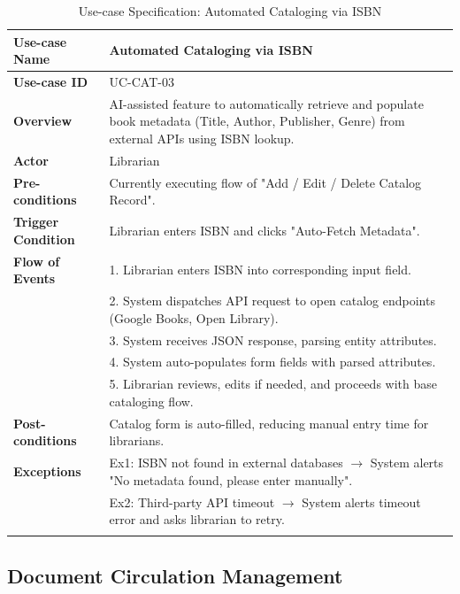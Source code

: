 \begin{longtable}{|p{3.5cm}|p{11.5cm}|}
    \hline
    \textbf{Use-case Name} & \textbf{Automated Cataloging via ISBN} \\
    \hline
    \textbf{Use-case ID} & UC-CAT-03 \\
    \hline
    \textbf{Overview} & AI-assisted feature to automatically retrieve and populate book metadata (Title, Author, Publisher, Genre) from external APIs using ISBN lookup. \\
    \hline
    \textbf{Actor} & Librarian \\
    \hline
    \textbf{Pre-conditions} & Currently executing flow of "Add / Edit / Delete Catalog Record". \\
    \hline
    \textbf{Trigger Condition} & Librarian enters ISBN and clicks "Auto-Fetch Metadata". \\
    \hline
    \textbf{Flow of Events} & 
    1. Librarian enters ISBN into corresponding input field.\\ 
 & 
    2. System dispatches API request to open catalog endpoints (Google Books, Open Library).\\ 
 & 
    3. System receives JSON response, parsing entity attributes.\\ 
 & 
    4. System auto-populates form fields with parsed attributes.\\ 
 & 
    5. Librarian reviews, edits if needed, and proceeds with base cataloging flow. \\
    \hline
    \textbf{Post-conditions} & Catalog form is auto-filled, reducing manual entry time for librarians. \\
    \hline
    \textbf{Exceptions} & 
    Ex1: ISBN not found in external databases $\rightarrow$ System alerts "No metadata found, please enter manually".\\ 
 & 
    Ex2: Third-party API timeout $\rightarrow$ System alerts timeout error and asks librarian to retry. \\
    \hline
    \caption{Use-case Specification: Automated Cataloging via ISBN} \\
\end{longtable}



\subsection{Document Circulation Management}

